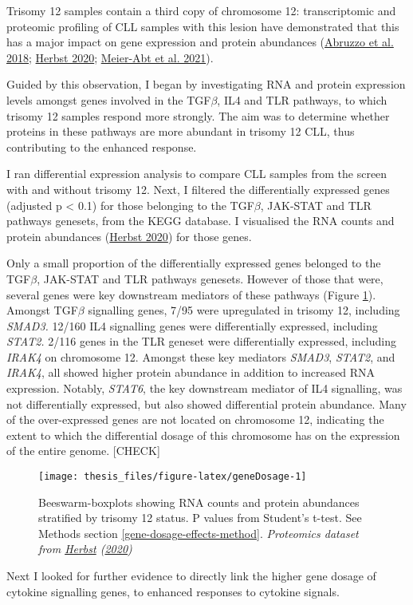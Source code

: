 \documentclass[11pt, a4paper, twosided]{book}
\begin{document}
Trisomy 12 samples contain a third copy of chromosome 12: transcriptomic and proteomic profiling of CLL samples with this lesion have demonstrated that this has a major impact on gene expression and protein abundances (\protect\hyperlink{ref-Abruzzo2018}{Abruzzo et al. 2018}; \protect\hyperlink{ref-HerbstThesis}{Herbst 2020}; \protect\hyperlink{ref-MeierAbt2021}{Meier-Abt et al. 2021}).

Guided by this observation, I began by investigating RNA and protein expression levels amongst genes involved in the TGF\(\beta\), IL4 and TLR pathways, to which trisomy 12 samples respond more strongly. The aim was to determine whether proteins in these pathways are more abundant in trisomy 12 CLL, thus contributing to the enhanced response.

I ran differential expression analysis to compare CLL samples from the screen with and without trisomy 12. Next, I filtered the differentially expressed genes (adjusted p \textless{} 0.1) for those belonging to the TGF\(\beta\), JAK-STAT and TLR pathways genesets, from the KEGG database. I visualised the RNA counts and protein abundances (\protect\hyperlink{ref-HerbstThesis}{Herbst 2020}) for those genes.

Only a small proportion of the differentially expressed genes belonged to the TGF\(\beta\), JAK-STAT and TLR pathways genesets. However of those that were, several genes were key downstream mediators of these pathways (Figure \ref{fig:geneDosage}). Amongst TGF\(\beta\) signalling genes, 7/95 were upregulated in trisomy 12, including \emph{SMAD3.} 12/160 IL4 signalling genes were differentially expressed, including \emph{STAT2.} 2/116 genes in the TLR geneset were differentially expressed, including \emph{IRAK4} on chromosome 12. Amongst these key mediators \emph{SMAD3}, \emph{STAT2}, and \emph{IRAK4}, all showed higher protein abundance in addition to increased RNA expression. Notably, \emph{STAT6}, the key downstream mediator of IL4 signalling, was not differentially expressed, but also showed differential protein abundance. Many of the over-expressed genes are not located on chromosome 12, indicating the extent to which the differential dosage of this chromosome has on the expression of the entire genome. {[}CHECK{]}


\begin{figure}

{\centering \texttt{[image: thesis\_files/figure-latex/geneDosage-1]} 

}

\caption{Beeswarm-boxplots showing RNA counts and protein abundances stratified by trisomy 12 status. P values from Student's t-test. See Methods section \ref{gene-dosage-effects-method}. \emph{Proteomics dataset from \protect\hyperlink{ref-HerbstThesis}{Herbst} (\protect\hyperlink{ref-HerbstThesis}{2020}) }}\label{fig:geneDosage}
\end{figure}
Next I looked for further evidence to directly link the higher gene dosage of cytokine signalling genes, to enhanced responses to cytokine signals.
\end{document}
